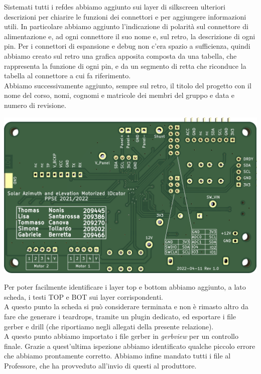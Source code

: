 \noindent Sistemati tutti i refdes abbiamo aggiunto sui layer di silkscreen
ulteriori descrizioni per chiarire le funzioni dei connettori e per
aggiungere informazioni utili. In particolare abbiamo aggiunto 
l’indicazione di polarità sul connettore di alimentazione e, ad ogni
connettore il suo nome e, sul retro, la descrizione di ogni pin. Per i
connettori di espansione e debug non c'era spazio a sufficienza, quindi
abbiamo creato sul retro una grafica apposita composta da una tabella,
che rappresenta la funzione di ogni pin, e da un segmento di retta che
riconduce la tabella al connettore a cui fa riferimento.\\
Abbiamo successivamente aggiunto, sempre sul retro, il titolo del
progetto con il nome del corso, nomi, cognomi e matricole dei membri del
gruppo e data e numero di revisione.

\begin{center}
\includegraphics[scale=0.2]{figures/image42.png}
\captionsetup{type=figure}
\end{center}

\noindent Per poter facilmente identificare i layer top e bottom abbiamo aggiunto,
a lato scheda, i testi TOP e BOT sui layer corrispondenti.\\
A questo punto la scheda si può considerare terminata e non è rimasto
altro da fare che generare i teardrops, tramite un plugin dedicato, ed
esportare i file gerber e drill (che riportiamo negli allegati della
presente relazione).\\
A questo punto abbiamo importato i file gerber in \emph{gerbview} per un
controllo finale. Grazie a quest'ultima ispezione abbiamo identificato
qualche piccolo errore che abbiamo prontamente corretto. Abbiamo infine
mandato tutti i file al Professore, che ha provveduto all'invio di
questi al produttore.
